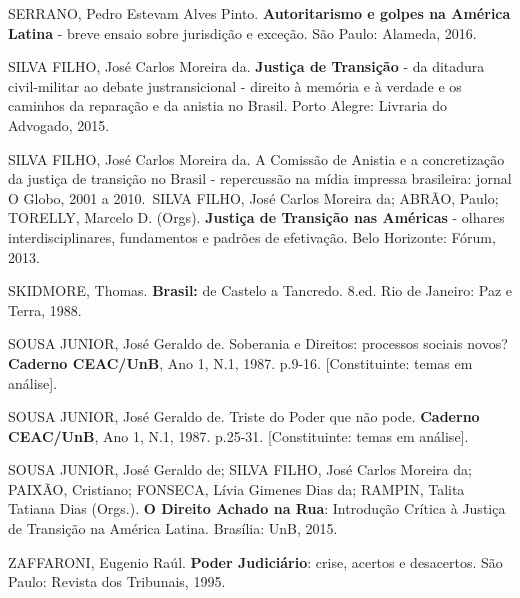 SERRANO, Pedro Estevam Alves Pinto. \textbf{Autoritarismo e golpes na
América Latina} - breve ensaio sobre jurisdição e exceção. São Paulo:
Alameda, 2016.

SILVA FILHO, José Carlos Moreira da. \textbf{Justiça de Transição} - da
ditadura civil-militar ao debate justransicional - direito à memória e à
verdade e os caminhos da reparação e da anistia no Brasil. Porto Alegre:
Livraria do Advogado, 2015.

SILVA FILHO, José Carlos Moreira da. A Comissão de Anistia e a
concretização da justiça de transição no Brasil - repercussão na mídia
impressa brasileira: jornal O Globo, 2001 a 2010.~SILVA FILHO, José
Carlos Moreira da; ABRÃO, Paulo; TORELLY, Marcelo D. (Orgs).
\textbf{Justiça de Transição nas Américas} - olhares interdisciplinares,
fundamentos e padrões de efetivação. Belo Horizonte: Fórum, 2013.

SKIDMORE, Thomas. \textbf{Brasil:} de Castelo a Tancredo. 8.ed. Rio de
Janeiro: Paz e Terra, 1988.

SOUSA JUNIOR, José Geraldo de. Soberania e Direitos: processos sociais
novos? \textbf{Caderno CEAC/UnB}, Ano 1, N.1, 1987. p.9-16.
{[}Constituinte: temas em análise{]}.

SOUSA JUNIOR, José Geraldo de. Triste do Poder que não pode.
\textbf{Caderno CEAC/UnB}, Ano 1, N.1, 1987. p.25-31. {[}Constituinte:
temas em análise{]}.

SOUSA JUNIOR, José Geraldo de; SILVA FILHO, José Carlos Moreira da;
PAIXÃO, Cristiano; FONSECA, Lívia Gimenes Dias da; RAMPIN, Talita
Tatiana Dias (Orgs.). \textbf{O Direito Achado na Rua}: Introdução
Crítica à Justiça de Transição na América Latina. Brasília: UnB, 2015.

ZAFFARONI, Eugenio Raúl. \textbf{Poder Judiciário}: crise, acertos e
desacertos. São Paulo: Revista dos Tribunais, 1995.
